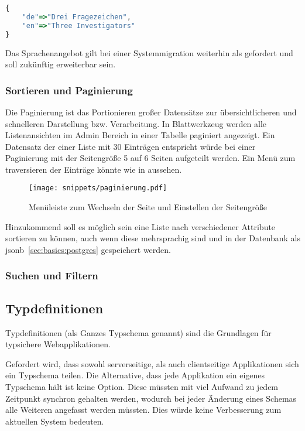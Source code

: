 \begin{lstlisting}[language=JavaScript,float=h!,caption={Speicherung der Projektnamen als jsonb}, label={sec:requirements:multilang}]
{
    "de"=>"Drei Fragezeichen",
    "en"=>"Three Investigators"
}
\end{lstlisting}

Das Sprachenangebot gilt bei einer Systemmigration weiterhin als gefordert und soll zukünftig erweiterbar sein.

\subsubsection{Sortieren und Paginierung}
Die Paginierung ist das Portionieren großer Datensätze zur übersichtlicheren und schnelleren Darstellung bzw. Verarbeitung.
In Blattwerkzeug werden alle Listenansichten im Admin Bereich in einer Tabelle paginiert angezeigt.
Ein Datensatz der einer Liste mit 30 Einträgen entspricht würde bei einer Paginierung mit der Seitengröße 5 auf 6 Seiten aufgeteilt werden.
Ein Menü zum traversieren der Einträge könnte wie in  aussehen.

\begin{figure}[h!]
    \centering
    \texttt{[image: snippets/paginierung.pdf]}
    \caption{Menüleiste zum Wechseln der Seite und Einstellen der Seitengröße}
    \label{req:view:pagination}
\end{figure}

Hinzukommend soll es möglich sein eine Liste nach verschiedener Attribute sortieren zu können, auch wenn diese mehrsprachig sind und
in der Datenbank als jsonb~\ref{sec:basics:postgres} gespeichert werden.

\subsubsection{Suchen und Filtern}

\subsection{Typdefinitionen}

Typdefinitionen (als Ganzes Typschema genannt) sind die Grundlagen für typsichere Webapplikationen.

Gefordert wird, dass sowohl serverseitige, als auch clientseitige Applikationen sich ein Typschema teilen. 
Die Alternative, dass jede Applikation ein eigenes Typschema hält ist keine Option. Diese müssten mit viel Aufwand zu jedem Zeitpunkt synchron gehalten werden, wodurch bei jeder Änderung eines Schemas alle Weiteren angefasst werden müssten. Dies würde keine Verbesserung zum aktuellen System bedeuten.

